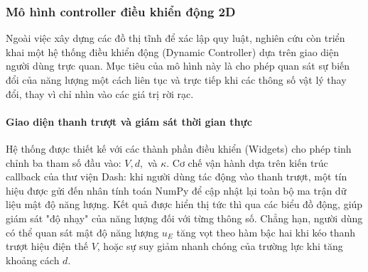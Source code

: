 \subsubsection{Mô hình controller điều khiển động 2D}
Ngoài việc xây dựng các đồ thị tĩnh để xác lập quy luật, nghiên cứu còn triển khai một hệ thống điều khiển động (Dynamic Controller) dựa trên giao diện người dùng trực quan. Mục tiêu của mô hình này là cho phép quan sát sự biến đổi của năng lượng một cách liên tục và trực tiếp khi các thông số vật lý thay đổi, thay vì chỉ nhìn vào các giá trị rời rạc.

\paragraph{Giao diện thanh trượt và giám sát thời gian thực\\}
Hệ thống được thiết kế với các thành phần điều khiển (Widgets) cho phép tinh chỉnh ba tham số đầu vào: $V, d,$ và $\kappa$. Cơ chế vận hành dựa trên kiến trúc callback của thư viện Dash: khi người dùng tác động vào thanh trượt, một tín hiệu được gửi đến nhân tính toán NumPy để cập nhật lại toàn bộ ma trận dữ liệu mật độ năng lượng. Kết quả được hiển thị tức thì qua các biểu đồ động, giúp giám sát "độ nhạy" của năng lượng đối với từng thông số. Chẳng hạn, người dùng có thể quan sát mật độ năng lượng $u_E$ tăng vọt theo hàm bậc hai khi kéo thanh trượt hiệu điện thế $V$, hoặc sự suy giảm nhanh chóng của trường lực khi tăng khoảng cách $d$.
